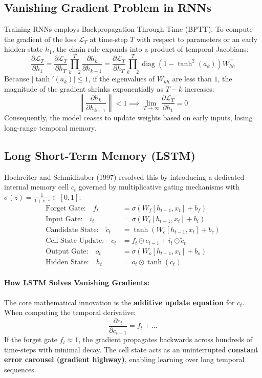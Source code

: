 \documentclass[12pt,a4paper]{article}
\begin{document}
\subsection{Vanishing Gradient Problem in RNNs}
Training RNNs employs Backpropagation Through Time (BPTT). To compute the gradient of the loss $\mathcal{L}_T$ at time-step $T$ with respect to parameters or an early hidden state $h_1$, the chain rule expands into a product of temporal Jacobians:
\begin{equation}
\frac{\partial \mathcal{L}_T}{\partial h_1} = \frac{\partial \mathcal{L}_T}{\partial h_T} \prod_{k=2}^{T} \frac{\partial h_k}{\partial h_{k-1}} = \frac{\partial \mathcal{L}_T}{\partial h_T} \prod_{k=2}^{T} \operatorname{diag}\left(1 - \tanh^2(a_k)\right) W_{hh}^{\top}
\end{equation}
Because $|\tanh'(a_k)| \le 1$, if the eigenvalues of $W_{hh}$ are less than $1$, the magnitude of the gradient shrinks exponentially as $T - k$ increases:
\begin{equation}
\left\| \frac{\partial h_k}{\partial h_{k-1}} \right\| < 1 \implies \lim_{T \to \infty} \frac{\partial \mathcal{L}_T}{\partial h_1} = 0
\end{equation}
Consequently, the model ceases to update weights based on early inputs, losing long-range temporal memory.

\subsection{Long Short-Term Memory (LSTM)}
Hochreiter and Schmidhuber (1997) resolved this by introducing a dedicated internal memory cell $c_t$ governed by multiplicative gating mechanisms with $\sigma(z) = \frac{1}{1 + e^{-z}} \in [0, 1]$:
\begin{align}
\text{Forget Gate:} \quad f_t &= \sigma(W_f [h_{t-1}, x_t] + b_f) \\
\text{Input Gate:} \quad i_t &= \sigma(W_i [h_{t-1}, x_t] + b_i) \\
\text{Candidate State:} \quad \tilde{c}_t &= \tanh(W_c [h_{t-1}, x_t] + b_c) \\
\text{Cell State Update:} \quad c_t &= f_t \odot c_{t-1} + i_t \odot \tilde{c}_t \\
\text{Output Gate:} \quad o_t &= \sigma(W_o [h_{t-1}, x_t] + b_o) \\
\text{Hidden State:} \quad h_t &= o_t \odot \tanh(c_t)
\end{align}

\paragraph{How LSTM Solves Vanishing Gradients:}
The core mathematical innovation is the \textbf{additive update equation} for $c_t$. When computing the temporal derivative:
\begin{equation}
\frac{\partial c_t}{\partial c_{t-1}} = f_t + \dots
\end{equation}
If the forget gate $f_t \approx 1$, the gradient propagates backwards across hundreds of time-steps with minimal decay. The cell state acts as an uninterrupted \textbf{constant error carousel (gradient highway)}, enabling learning over long temporal sequences.
\end{document}
